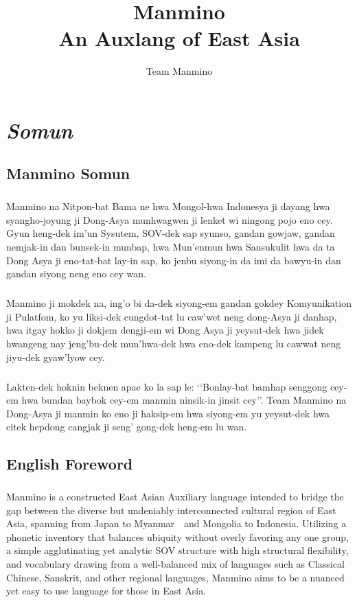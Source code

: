 \documentclass{book}
\title{%
    Manmino\\
    \large An Auxlang of East Asia}
\author{Team Manmino}
\begin{document}
\maketitle\thispagestyle{empty} \frontmatter

\chapter*{\textit{Somun}}
    \section{Manmino Somun} 
        \paragraph{}
        Manmino na Nitpon-bat Bama ne hwa Mongol-hwa Indonesya ji dayang hwa syangho-joyung ji Dong-Asya munhwagwen ji lenket wi ningong pojo eno cey. 
        Gyun heng-dek im'un Sysutem, 
        SOV-dek sap syunso,  gandan gowjaw, gandan nemjak-in dan bunsek-in munbap, 
        hwa Mun'enmun hwa Sansukulit hwa da ta Dong Asya ji eno-tat-bat lay-in sap, 
        ko jenbu siyong-in da imi da bawyu-in dan gandan siyong neng eno cey wan. 
        \paragraph{}
        Manmino ji mokdek na, ing'o bi da-dek siyong-em gandan gokdey Komyunikation ji Pulatfom, ko yu liksi-dek cungdot-tat lu caw'wet neng dong-Asya ji danhap,
        hwa itgay hokko ji dokjem dengji-em wi Dong Asya ji yeysut-dek hwa jidek hwangeng nay jeng'bu-dek mun'hwa-dek hwa eno-dek kampeng lu cawwat neng jiyu-dek gyaw'lyow cey.
        \paragraph{}
        Lakten-dek hoknin beknen apae ko la sap le: \lq\lq Bonlay-bat bamhap senggong cey-em hwa bundan baybok cey-em manmin ninsik-in jinsit cey\rq\rq.
        Team Manmino na Dong-Asya ji manmin ko eno ji haksip-em hwa siyong-em yu yeysut-dek hwa citek hepdong cangjak ji seng' gong-dek heng-em lu wan.
        
        \vfill \newpage
    \section{English Foreword} 
        \paragraph{} 
        Manmino is a constructed East Asian Auxiliary language intended to bridge the gap between the diverse but undeniably interconnected cultural region of East Asia, spanning from Japan to Myanmar　and Mongolia to Indonesia. 
        Utilizing a phonetic inventory that balances ubiquity without overly favoring any one group, 
        a simple agglutinating yet analytic SOV structure with high structural flexibility, 
        and vocabulary drawing from a well-balanced mix of languages such as Classical Chinese, Sanskrit, and other regional languages, 
        Manmino aims to be a nuanced yet easy to use language for those in East Asia. 
\end{document}
